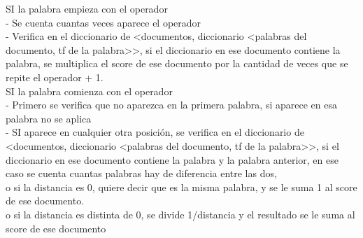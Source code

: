\documentclass[12pt, a4paper]{article}
\begin{document}
\begin{enumerate}
\begin{itemize}
                    SI la palabra empieza con el operador \*\\
                    - Se cuenta cuantas veces aparece el operador\\
                    - Verifica en el diccionario de
                              <documentos, diccionario <palabras del documento, tf de la palabra>>,
                              si el diccionario en ese documento contiene la palabra,
                              se multiplica el score de ese documento por la cantidad de veces que
                              se repite el operador + 1.\\


                    SI la palabra comienza con el operador \~\\
                    - Primero se verifica que no aparezca en la primera palabra,
                              si aparece en esa palabra no se aplica\\
                    - SI aparece en cualquier otra posición,
                              se verifica en el diccionario de
                              <documentos, diccionario <palabras del documento, tf de la palabra>>,
                              si el diccionario en ese documento contiene la palabra y la palabra anterior,
                              en ese caso se cuenta cuantas palabras hay de diferencia entre las dos,\\
                              o si la distancia es 0, quiere decir que es la misma palabra, y se le suma 1 al score
                              de ese documento.\\
                              o si la distancia es distinta de 0, se divide 1/distancia y el resultado se le suma
                              al score de ese documento\\


          \end{itemize}


\end{enumerate}
\end{document}

